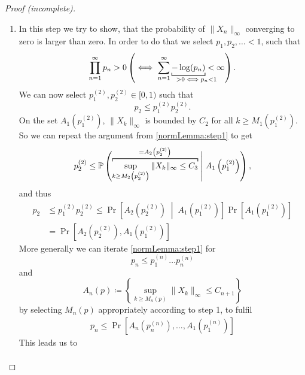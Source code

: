 \begin{proof}[Proof (incomplete)]
\begin{enumerate}[label= Step \arabic*:, ref= Step \arabic*, leftmargin=0pt]
\begin{align*}
        \le \lim_{n\to\infty} \sum_{x\in S} \Pr\left(\sup_{k\ge n}|X_k(x)| > C_2  \right)=0,
    \end{align*}
    we can select \(M_1(p_1)\in\N\) such that the probability of
    \[
        A_1(p_1)\coloneqq  \left\{\sup_{k\ge M_1(p_1)} \|X_k\|_\infty \le C_2\right\}
    \]
    is larger than \(p_1\in[0,1)\).
    \item\label{normLemma:step2} In this step we try to show, that the probability of \(\|X_n\|_\infty\) converging to zero is larger than zero. In order to do that we select \(p_1,p_2,\dots <1\), such that
    \[
        \prod_{n=1}^\infty p_n >0 \left(\iff \sum_{n=1}^\infty \underbracket[0.7pt]{-\log(p_n)}_{>0 \iff \mathrlap{p_n <1}}< \infty \right).
    \]
    We can now select \(p_1^{(2)},p_2^{(2)}\in[0,1)\) such that 
    \[
        p_2\le p_1^{(2)}p_2^{(2)}.    
    \]
    On the set \(A_1\left(p_1^{(2)}\right)\), \(\|X_k\|_\infty\) is bounded by \(C_2\) for all \(k\ge M_1\left(p_1^{(2)}\right)\). So we can repeat the argument from \ref{normLemma:step1} to get
    \[
        p_2^{(2)}\le \vphantom{
            \overbracket[0.7pt]{
                \sup_{k\ge M_2\left(p_2^{(2)} \right)}\|X_k\|_\infty \le C_3
            }^{
            =A_2\left( p_2^{(2)}\right)
        }
        }\Pr\left(\vphantom{
            \sup_{k\ge M_2\left(p_2^{(2)} \right)}
        }
        \smash{\overbracket[0.7pt]{
                \sup_{k\ge M_2\left(p_2^{(2)} \right)}\|X_k\|_\infty \le C_3
            }^{
            =A_2\left( p_2^{(2)}\right)
        }} \;\middle|\; A_1\left(p_1^{(2)} \right)\right),
    \]
    and thus
    \begin{align*}
        p_2
        &\le p_1^{(2)}p_2^{(2)} 
        \le \Pr\left[A_2\left( p_2^{(2)}\right)
        \;\middle|\; A_1\left(p_1^{(2)} \right)\right] \Pr\left[A_1\left(p_1^{(2)}\right)\right]\\
        &=\Pr\left[A_2\left( p_2^{(2)}\right), A_1\left(p_1^{(2)} \right)\right]
    \end{align*}
    More generally we can iterate \ref{normLemma:step1} for 
    \[
       p_n\le p_1^{(n)}\dots p_n^{(n)} 
    \]
    and
    \[
        A_n(p)\coloneqq \left\{\sup_{k\ge M_n(p)}\|X_k\|_\infty \le C_{n+1} \right\}
    \]
    by selecting \(M_n(p)\) appropriately according to step 1, to fulfil
    \begin{align}\label{vep_0 inequality}
        p_n\le \Pr\left[ A_n\left( p_n^{(n)}\right),\dots, A_1\left(p_1^{(n)} \right)\right]
    \end{align}
    This leads us to
    \begin{align}

\end{align}
\end{enumerate}
\end{proof}
